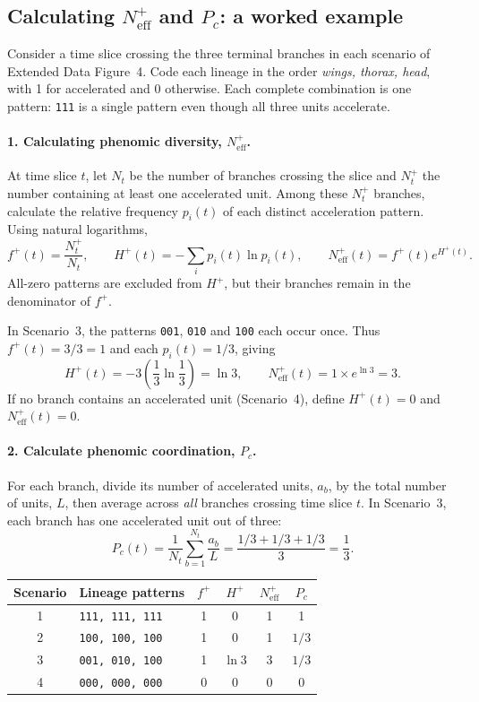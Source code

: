\documentclass[11pt,a4paper]{article}
\begin{document}
\subsection*{Calculating \(N_{\mathrm{eff}}^{+}\) and \(P_c\): a worked example}

Consider a time slice crossing the three terminal branches in each scenario of Extended Data Figure~4. Code each lineage in the order \emph{wings, thorax, head}, with 1 for accelerated and 0 otherwise. Each complete combination is one pattern: \texttt{111} is a single pattern even though all three units accelerate.

\paragraph{1. Calculating phenomic diversity, \(N_{\mathrm{eff}}^{+}\).}
At time slice \(t\), let \(N_t\) be the number of branches crossing the slice and \(N_t^{+}\) the number containing at least one accelerated unit. Among these \(N_t^{+}\) branches, calculate the relative frequency \(p_i(t)\) of each distinct acceleration pattern. Using natural logarithms,
\[
f^{+}(t)=\frac{N_t^{+}}{N_t},\qquad
H^{+}(t)=-\sum_i p_i(t)\ln p_i(t),\qquad
N_{\mathrm{eff}}^{+}(t)=f^{+}(t)e^{H^{+}(t)}.
\]
All-zero patterns are excluded from \(H^{+}\), but their branches remain in the denominator of \(f^{+}\).

In Scenario~3, the patterns \texttt{001}, \texttt{010} and \texttt{100} each occur once. Thus \(f^{+}(t)=3/3=1\) and each \(p_i(t)=1/3\), giving
\[
H^{+}(t)=-3\left(\frac13\ln\frac13\right)=\ln3,
\qquad N_{\mathrm{eff}}^{+}(t)=1\times e^{\ln3}=3.
\]
If no branch contains an accelerated unit (Scenario~4), define \(H^{+}(t)=0\) and \(N_{\mathrm{eff}}^{+}(t)=0\).

\paragraph{2. Calculate phenomic coordination, \(P_c\).}
For each branch, divide its number of accelerated units, \(a_b\), by the total number of units, \(L\), then average across \emph{all} branches crossing time slice \(t\). In Scenario~3, each branch has one accelerated unit out of three:
\[
P_c(t)=\frac{1}{N_t}\sum_{b=1}^{N_t}\frac{a_b}{L}
=\frac{1/3+1/3+1/3}{3}=\frac13.
\]

\begin{center}
\begin{tabular}{clcccc}
\toprule
Scenario & Lineage patterns & \(f^{+}\) & \(H^{+}\) & \(N_{\mathrm{eff}}^{+}\) & \(P_c\) \\
\midrule
1 & \texttt{111, 111, 111} & 1 & 0 & 1 & 1 \\
2 & \texttt{100, 100, 100} & 1 & 0 & 1 & \(1/3\) \\
3 & \texttt{001, 010, 100} & 1 & \(\ln3\) & 3 & \(1/3\) \\
4 & \texttt{000, 000, 000} & 0 & 0 & 0 & 0 \\
\bottomrule
\end{tabular}
\end{center}
\end{document}
